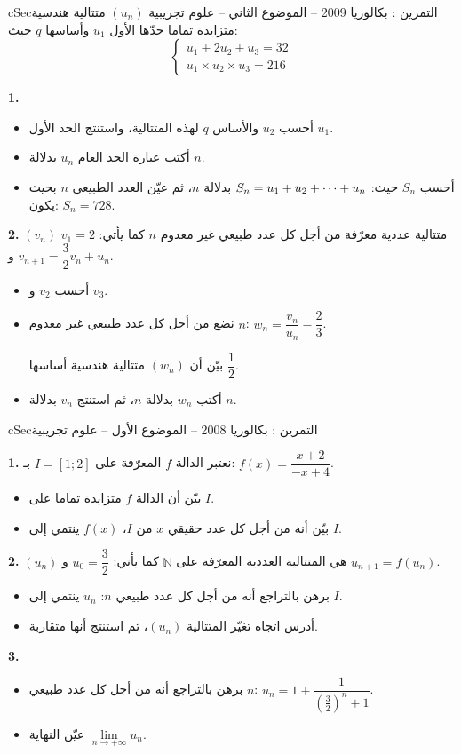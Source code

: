 \documentclass[12pt,a4paper]{article}
\newenvironment{BOX}[2]{\begin{otherlanguage}{english}\begin{arbox}{#1}{#2}}{\end{arbox}\end{otherlanguage}}
\newcounter{exo}
\newenvironment{tamrin}[1]{\stepcounter{exo}\begin{BOX}{cSec}{التمرين \theexo: #1}}{\end{BOX}}
\renewcommand{\cdots}{\mathinner{\cdotp\cdotp\cdotp}}
\newcommand{\N}{\mathbb{N}}
\newenvironment{sq}{\begin{itemize}[leftmargin=2.4em,itemsep=3pt]}{\end{itemize}}
\newcommand{\qa}{\item[(أ)]}\newcommand{\qb}{\item[(ب)]}\newcommand{\qc}{\item[(جـ)]}\newcommand{\qd}{\item[(د)]}\newcommand{\qe}{\item[(هـ)]}
\newcommand{\QQ}[1]{\par\smallskip\textbf{#1.} }
\begin{document}
\begin{tamrin}{بكالوريا 2009 -- الموضوع الثاني -- علوم تجريبية}
$(u_n)$ متتالية هندسية متزايدة تماما حدّها الأول $u_1$ وأساسها $q$ حيث:
\[\begin{cases}u_1+2u_2+u_3=32\\ u_1\times u_2\times u_3=216\end{cases}\]
\QQ{1}
\begin{sq}
\qa أحسب $u_2$ والأساس $q$ لهذه المتتالية، واستنتج الحد الأول $u_1$.
\qb أكتب عبارة الحد العام $u_n$ بدلالة $n$.
\qc أحسب $S_n$ حيث: $S_n=u_1+u_2+\cdots+u_n$ بدلالة $n$، ثم عيّن العدد الطبيعي $n$ بحيث يكون: $S_n=728$.
\end{sq}
\QQ{2} $(v_n)$ متتالية عددية معرّفة من أجل كل عدد طبيعي غير معدوم $n$ كما يأتي: $v_1=2$ و $v_{n+1}=\dfrac32v_n+u_n$.
\begin{sq}
\qa أحسب $v_2$ و $v_3$.
\qb نضع من أجل كل عدد طبيعي غير معدوم $n$: $w_n=\dfrac{v_n}{u_n}-\dfrac23$.

بيّن أن $(w_n)$ متتالية هندسية أساسها $\dfrac12$.
\qc أكتب $w_n$ بدلالة $n$، ثم استنتج $v_n$ بدلالة $n$.
\end{sq}
\end{tamrin}

\begin{tamrin}{بكالوريا 2008 -- الموضوع الأول -- علوم تجريبية}
\QQ{1} نعتبر الدالة $f$ المعرّفة على $I=[1;2]$ بـ: $f(x)=\dfrac{x+2}{-x+4}$.
\begin{sq}
\qa بيّن أن الدالة $f$ متزايدة تماما على $I$.
\qb بيّن أنه من أجل كل عدد حقيقي $x$ من $I$، $f(x)$ ينتمي إلى $I$.
\end{sq}
\QQ{2} $(u_n)$ هي المتتالية العددية المعرّفة على $\N$ كما يأتي: $u_0=\dfrac32$ و $u_{n+1}=f(u_n)$.
\begin{sq}
\qa برهن بالتراجع أنه من أجل كل عدد طبيعي $n$: $u_n$ ينتمي إلى $I$.
\qb أدرس اتجاه تغيّر المتتالية $(u_n)$، ثم استنتج أنها متقاربة.
\end{sq}
\QQ{3}
\begin{sq}
\qa برهن بالتراجع أنه من أجل كل عدد طبيعي $n$: $u_n=1+\dfrac{1}{\left(\frac32\right)^n+1}$.
\qb عيّن النهاية $\lim\limits_{n\to+\infty}u_n$.
\end{sq}
\end{tamrin}
\end{document}
